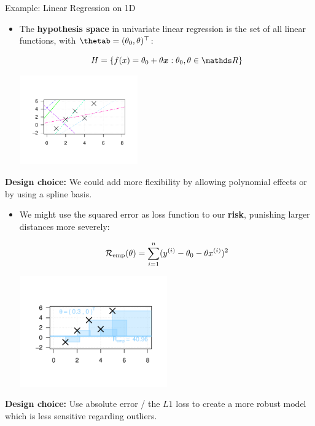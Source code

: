 \documentclass[11pt,compress,t,notes=noshow, xcolor=table]{beamer}
\begin{document}
\begin{vbframe}{Example: Linear Regression on 1D}


\begin{itemize}
  
  \item The \textbf{hypothesis space} in univariate linear regression is the set 
  of all linear functions, with $\thetab = (\theta_0, \theta)^\top$:
  
  $$\Hspace = \{\fx = \theta_0 + \theta \xv: \theta_0, \theta \in \R \}$$
  
  \begin{center}
    \includegraphics[trim = 1.5cm 1.5cm 1.5cm 1.5cm, width = 0.4\textwidth]{figure/lm_reg3} 
  \end{center}
\end{itemize}
  \textbf{Design choice:} We could add more flexibility by allowing polynomial effects or by using a spline basis.
  
  \framebreak
\begin{itemize}  
  \item We might use the squared error as loss function to our
  \textbf{risk}, punishing larger distances %
  more severely:
  
  $$\mathcal{R}_{\text{emp}}(\theta) = \sum_{i=1}^n (y^{(i)} - \theta_0 - \theta x^{(i)})^2$$
  
  \begin{center}
    \includegraphics[trim = 1.5cm 1.5cm 1.5cm 1.5cm, width = 0.5\textwidth]{figure/lm_reg1} 
  \end{center}
\end{itemize}
  \textbf{Design choice:} Use absolute error / the $L1$ loss to create a more robust model which is less sensitive regarding outliers.
  

\end{vbframe}
\end{document}
